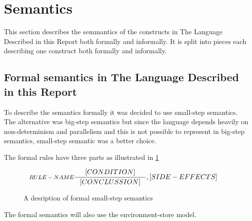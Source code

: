 \section{Semantics}
This section describes the semmantics of the constructs in The Language Described in this Report both formally and informally. It is split into pieces each describing one construct both formally and informally.

\subsection{Formal semantics in The Language Described in this Report}
To describe the semantics formally it was decided to use small-step semantics. The alternative was big-step semantics but since the language depends heavily on non-determinism and parallelism and this is not possible to represent in big-step semantics, small-step semantic was a better choice.

The formal rules have three parts as illustrated in \cref{SM-semantics}

\begin{figure}[H]
\begin{align*}
&\inference[$RULE-NAME$]{[CONDITION]}
												{[CONCLUSSION]}
												{,[SIDE-EFFECTS]}
\end{align*}
\caption{A desription of formal small-step semantics}
\label{SM-semantics}
\end{figure}

The formal semantics will also use the environment-store model.

